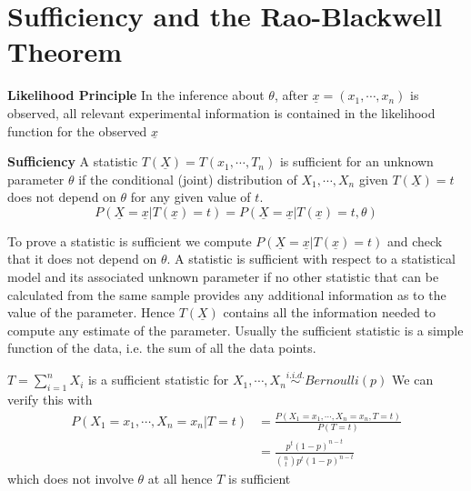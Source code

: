 \documentclass[11pt]{article}
\begin{document}
\section*{Sufficiency and the Rao-Blackwell Theorem}


\begin{defn*}
  \textbf{Likelihood Principle} In the inference about $\theta$, after $\underline{x} = (x_1, \cdots, x_n)$ is observed, all relevant experimental information is contained in the likelihood function for the observed $\underline{x}$
\end{defn*}


\begin{defn*}
  \textbf{Sufficiency} A statistic $T(\underline{X}) = T(x_1, \cdots,T_n)$ is sufficient for an unknown parameter $\theta$ if the conditional (joint) distribution of $X_1, \cdots, X_n$ given $T(\underline{X}) = t$ does not depend on $\theta$ for any given value of $t$.
  \[
    P(\underline{X} = \underline{x}|T(\underline{x}) = t) = P(\underline{X} = \underline{x}|T(\underline{x}) = t, \theta)
  \]
  \begin{rem}
    To prove a statistic is sufficient we compute $P(\underline{X} = \underline{x}|T(\underline{x}) = t)$ and check that it does not depend on $\theta$. A statistic is sufficient with respect to a statistical model and its associated unknown parameter if no other statistic that can be calculated from the same sample provides any additional information as to the value of the parameter. Hence $T(\underline{X})$ contains all the information needed to compute any estimate of the parameter. Usually the sufficient statistic is a simple function of the data, i.e. the sum of all the data points.
  \end{rem}
\end{defn*}

\begin{example}
  $T = \sum_{i=1}^n X_i$ is a sufficient statistic for $X_1, \cdots, X_n \stackrel{i.i.d.}{\sim} Bernoulli(p)$ We can verify this with
  \begin{align*}
      P(X_1 = x_1, \cdots, X_n = x_n | T = t) &= \frac{P(X_1 = x_1, \cdots, X_n = x_n, T = t)}{P(T = t)} \\
      &= \frac{p^t(1-p)^{n-t}}{\binom{n}{t}p^t(1-p)^{n-t}}
  \end{align*}
  which does not involve $\theta$ at all hence $T$ is sufficient
\end{example}
\end{document}
